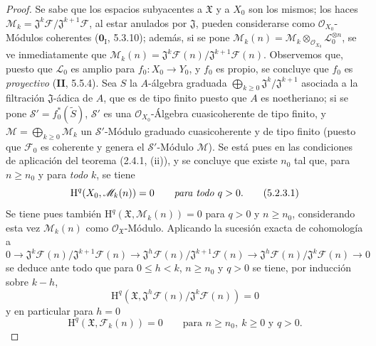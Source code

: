 \begin{proof}
Se sabe que los espacios subyacentes a $\mathfrak X$ y a $X_0$ son los mismos;
los haces
$\mathcal M_k=\mathfrak J^k\mathcal F/\mathfrak J^{k+1}\mathcal F$,
al estar anulados por $\mathfrak J$, pueden considerarse como
$\mathcal O_{X_0}$-Módulos coherentes ($\mathbf{0}_{\mathrm I}$, 5.3.10); además, si se
pone $\mathcal M_k(n)=\mathcal M_k\otimes_{\mathcal O_{X_0}}
\mathcal L_0^{\otimes n}$, se ve inmediatamente que
$\mathcal M_k(n)=\mathfrak J^k\mathcal F(n)/
\mathfrak J^{k+1}\mathcal F(n)$.
Observemos que, puesto que $\mathcal L_0$ es amplio para $f_0:X_0\to Y_0$, y
$f_0$ es propio, se concluye que $f_0$ es \emph{proyectivo} (\textbf{II}, 5.5.4). Sea $S$ la $A$-álgebra
graduada $\bigoplus_{k\geq0}\mathfrak J^k/\mathfrak J^{k+1}$ asociada a la filtración $\mathfrak J$-ádica de $A$, que es
de tipo finito puesto que $A$ es noetheriano; si se pone
$\mathcal S'=f_0^*(\widetilde S)$,
$\mathcal S'$ es una
$\mathcal O_{X_0}$-Álgebra cuasicoherente de tipo finito, y
$\mathcal M=\bigoplus_{k\geq0}\mathcal M_k$ un
$\mathcal S'$-Módulo graduado cuasicoherente y de tipo finito (puesto que $\mathcal F_0$
es coherente y genera el $\mathcal S'$-Módulo $\mathcal M$). Se está pues en las
condiciones de aplicación del teorema (2.4.1, (ii)), y se concluye que existe
$n_0$ tal que, para $n\geq n_0$ y para \emph{todo} $k$, se tiene
\begin{equation}
\mathrm H^q(X_0,\mathcal M_k(n))=0\qquad\text{\emph{para todo} }q>0.
\tag{5.2.3.1}
\label{III.5.2.3.1-fr}
\end{equation}
Se tiene pues también $\mathrm H^q(\mathfrak X,\mathcal M_k(n))=0$ para $q>0$ y
$n\geq n_0$, considerando esta vez $\mathcal M_k(n)$ como
$\mathcal O_{\mathfrak X}$-Módulo. Aplicando la sucesión exacta de cohomología a
\[
0\to
\mathfrak J^k\mathcal F(n)/\mathfrak J^{k+1}\mathcal F(n)
\to
\mathfrak J^h\mathcal F(n)/\mathfrak J^{k+1}\mathcal F(n)
\to
\mathfrak J^h\mathcal F(n)/\mathfrak J^k\mathcal F(n)
\to0
\]
se deduce ante todo que para $0\leq h<k$, $n\geq n_0$ y $q>0$ se tiene, por
inducción sobre $k-h$,
\begin{equation}
\mathrm H^q(\mathfrak X,
\mathfrak J^h\mathcal F(n)/\mathfrak J^k\mathcal F(n))=0
\tag{5.2.3.2}
\label{III.5.2.3.2-fr}
\end{equation}
y en particular para $h=0$
\begin{equation}
\mathrm H^q(\mathfrak X,\mathcal F_k(n))=0
\qquad\text{para }n\geq n_0,\ k\geq0\text{ y }q>0.
\tag{5.2.3.3}
\label{III.5.2.3.3-fr}
\end{equation}

\end{proof}
